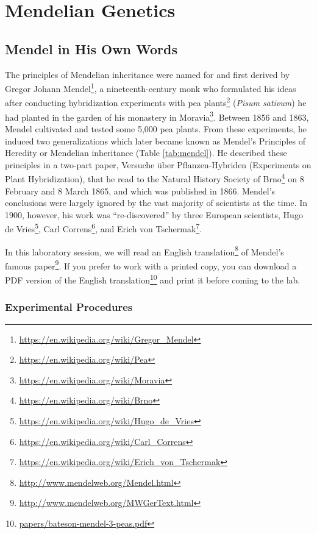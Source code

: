 \documentclass[]{book}
\let\rmarkdownfootnote\footnote%
\def\footnote{\protect\rmarkdownfootnote}
\renewcommand{\href}[2]{#2\footnote{\url{#1}}}
\begin{document}
\hypertarget{mendelian-genetics}{%
\chapter{Mendelian Genetics}\label{mendelian-genetics}}

\hypertarget{mendel-in-his-own-words}{%
\section{Mendel in His Own Words}\label{mendel-in-his-own-words}}

The principles of Mendelian inheritance were named for and first derived by \href{https://en.wikipedia.org/wiki/Gregor_Mendel}{Gregor Johann Mendel}, a nineteenth-century monk who formulated his ideas after conducting hybridization experiments with \href{https://en.wikipedia.org/wiki/Pea}{pea plants} (\emph{Pisum sativum}) he had planted in the garden of his monastery in \href{https://en.wikipedia.org/wiki/Moravia}{Moravia}. Between 1856 and 1863, Mendel cultivated and tested some 5,000 pea plants. From these experiments, he induced two generalizations which later became known as Mendel's Principles of Heredity or Mendelian inheritance (Table \ref{tab:mendel}). He described these principles in a two-part paper, Versuche über Pflanzen-Hybriden (Experiments on Plant Hybridization), that he read to the Natural History Society of \href{https://en.wikipedia.org/wiki/Brno}{Brno} on 8 February and 8 March 1865, and which was published in 1866. Mendel's conclusions were largely ignored by the vast majority of scientists at the time. In 1900, however, his work was ``re-discovered'' by three European scientists, \href{https://en.wikipedia.org/wiki/Hugo_de_Vries}{Hugo de Vries}, \href{https://en.wikipedia.org/wiki/Carl_Correns}{Carl Correns}, and \href{https://en.wikipedia.org/wiki/Erich_von_Tschermak}{Erich von Tschermak}.

In this laboratory session, we will read an \href{http://www.mendelweb.org/Mendel.html}{English translation} of \href{http://www.mendelweb.org/MWGerText.html}{Mendel's famous paper}. If you prefer to work with a printed copy, you can download a \href{papers/bateson-mendel-3-peas.pdf}{PDF version of the English translation} and print it before coming to the lab.

\hypertarget{experimental-procedures-2}{%
\subsection{Experimental Procedures}\label{experimental-procedures-2}}
\end{document}
